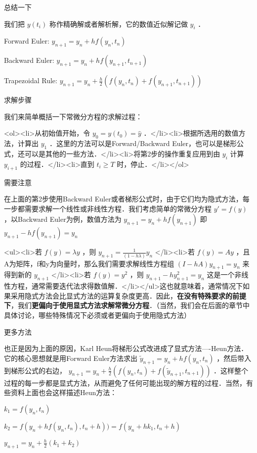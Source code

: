 总结一下

我们把  $y(t_i)$  称作精确解或者解析解，它的数值近似解记做  $y_i$ ．

Forward Euler:  $y_{n+1}=y_n+hf(y_n,t_n)$  

Backward Euler:  $y_{n+1}=y_n+hf(y_{n+1},t_{n+1})$  

Trapezoidal Rule:  $y_{n+1}=y_n+\frac{h}{2}\left(f(y_n,t_n)+f(y_{n+1},t_{n+1}) \right)$  



求解步骤

我们来简单概括一下常微分方程的求解过程：

<ol><li>从初始值开始，令  $y_0=y(t_0)=\hat{y}$  ．</li><li>根据所选用的数值方法，计算出  $y_1$  ．这里的方法可以是Forward/Backward Euler，也可以是梯形公式，还可以是其他的一些方法．</li><li>将第2步的操作重复应用到由  $y_i$  计算  $y_{i+1}$  的过程．</li><li>直到  $t_i\ge T$  时，停止．</li></ol>

需要注意

在上面的第2步使用Backward Euler或者梯形公式时，由于它们均为隐式方法，每一步都需要求解一个线性或非线性方程．我们考虑简单的常微分方程  $y'=f(y)$  ，以Backward Euler为例，数值方法为 $y_{n+1}=y_{n}+hf(y_{n+1})$  即  $y_{n+1}-hf(y_{n+1})=y_{n}$  

<ul><li>若  $f(y)=\lambda y$  ，则  $y_{n+1}=\frac{1}{(1-h\lambda)}y_n$  </li><li>若  $f(y)=A y$  ，且A为矩阵，f和y为向量时，那么我们需要求解线性方程组  $(I-hA)y_{n+1}=y_n$  来得到新的  $y_{n+1}$  </li><li>若  $f(y)=y^2$  ，则  $y_{n+1}-hy^2_{n+1} = y_n$ 这是一个非线性方程，通常需要迭代法求得数值解．</li></ul>这也就意味着，通常情况下如果采用隐式方法会比显式方法的运算复杂度更高．因此，\textbf{在没有特殊要求的前提下}，我们\textbf{更偏向于使用显式方法求解常微分方程}．（当然，我们会在后面的章节中具体讨论，哪些特殊情况下必须或者更偏向于使用隐式方法）



更多方法

也正是因为上面的原因，Karl Heun将梯形公式改进成了显式方法----Heun方法．它的核心思想就是用Forward Euler方法求出  $\tilde{y}_{n+1}=y_n+hf(y_n,t_n)$ ，然后带入到梯形公式的右边，  $y_{n+1}=y_n+\frac{h}{2}\left(f(y_n,t_n)+f(\tilde{y}_{n+1},t_{n+1}) \right)$ ．这样整个过程的每一步都是显式方法，从而避免了任何可能出现的解方程的过程．当然，有些资料上面也会这样描述Heun方法：

 $k_1=f(y_n,t_n)$  

 $k_2=f(y_n+hf(y_n,t_n),t_n+h))=f(y_n+hk_1,t_n+h)$  

 $y_{n+1}=y_n+\frac{h}{2}(k_1+k_2)$  

